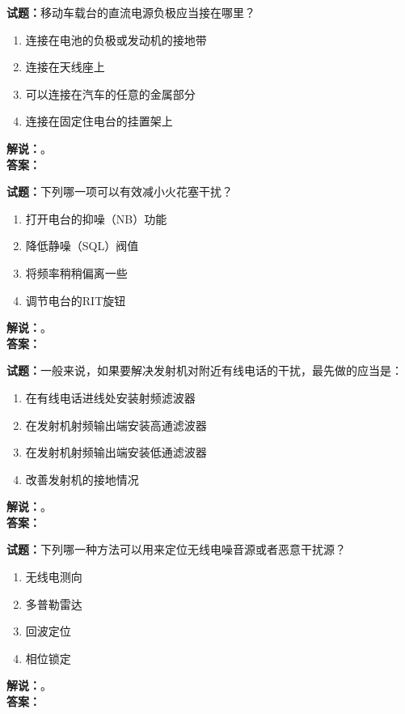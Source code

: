 \documentclass{ctexbook}
\begin{document}
\bigskip

\noindent\textbf{试题：}移动车载台的直流电源负极应当接在哪里？
\begin{enumerate}[leftmargin=3em]
  \item 连接在电池的负极或发动机的接地带
  \item 连接在天线座上
  \item 可以连接在汽车的任意的金属部分
  \item 连接在固定住电台的挂置架上
\end{enumerate}
\noindent\textbf{解说：}\textbf{}。\\\noindent\textbf{答案：}

\bigskip

\noindent\textbf{试题：}下列哪一项可以有效减小火花塞干扰？
\begin{enumerate}[leftmargin=3em]
  \item 打开电台的抑噪（NB）功能
  \item 降低静噪（SQL）阀值
  \item 将频率稍稍偏离一些
  \item 调节电台的RIT旋钮
\end{enumerate}
\noindent\textbf{解说：}\textbf{}。\\\noindent\textbf{答案：}

\bigskip

\noindent\textbf{试题：}一般来说，如果要解决发射机对附近有线电话的干扰，最先做的应当是：
\begin{enumerate}[leftmargin=3em]
  \item 在有线电话进线处安装射频滤波器
  \item 在发射机射频输出端安装高通滤波器
  \item 在发射机射频输出端安装低通滤波器
  \item 改善发射机的接地情况
\end{enumerate}
\noindent\textbf{解说：}\textbf{}。\\\noindent\textbf{答案：}

\bigskip

\noindent\textbf{试题：}下列哪一种方法可以用来定位无线电噪音源或者恶意干扰源？
\begin{enumerate}[leftmargin=3em]
  \item 无线电测向
  \item 多普勒雷达
  \item 回波定位
  \item 相位锁定
\end{enumerate}
\noindent\textbf{解说：}\textbf{}。\\\noindent\textbf{答案：}








\end{document}
